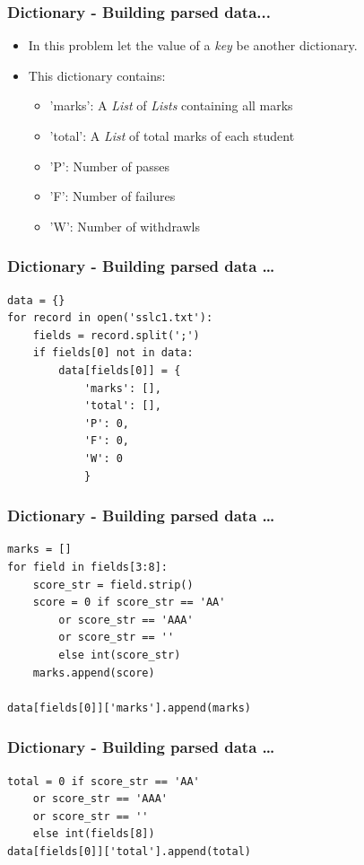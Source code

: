 \documentclass[14pt,compress]{beamer}
\begin{document}
\begin{frame}[fragile]
  \frametitle{Dictionary - Building parsed data...}
  \begin{itemize}
    \item In this problem let the value of a \emph{key} be another dictionary.
    \item This dictionary contains:
    \begin{itemize}
      \item 'marks': A \emph{List} of \emph{Lists} containing all marks
      \item 'total': A \emph{List} of total marks of each student
      \item 'P': Number of passes
      \item 'F': Number of failures
      \item 'W': Number of withdrawls
    \end{itemize}
  \end{itemize}
\end{frame}

\begin{frame}[fragile]
  \frametitle{Dictionary - Building parsed data \ldots}
  \small
  \begin{lstlisting}
data = {}
for record in open('sslc1.txt'):
    fields = record.split(';')
    if fields[0] not in data:
        data[fields[0]] = {
            'marks': [],
            'total': [],
            'P': 0,
            'F': 0,
            'W': 0
            }
  \end{lstlisting}
\end{frame}

\begin{frame}[fragile]
  \frametitle{Dictionary - Building parsed data \ldots}
  \begin{lstlisting}
marks = []
for field in fields[3:8]:
    score_str = field.strip()
    score = 0 if score_str == 'AA'
        or score_str == 'AAA'
        or score_str == ''
        else int(score_str)
    marks.append(score)

data[fields[0]]['marks'].append(marks)
  \end{lstlisting}
\end{frame}

\begin{frame}[fragile]
  \frametitle{Dictionary - Building parsed data \ldots}
  \begin{lstlisting}
total = 0 if score_str == 'AA'
    or score_str == 'AAA'
    or score_str == ''
    else int(fields[8])
data[fields[0]]['total'].append(total)
  \end{lstlisting}
\end{frame}
\end{document}
